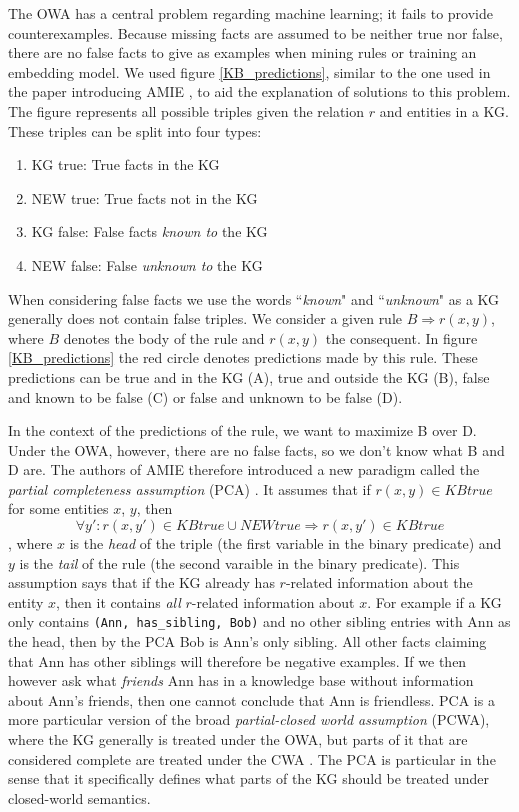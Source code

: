 The OWA has a central problem regarding machine learning; it fails to provide counterexamples. Because missing facts are assumed to be neither true nor false, there are no false facts to give as examples when mining rules or training an embedding model. We used figure \ref{KB_predictions}, similar to the one used in the paper introducing AMIE \cite{amie}, to aid the explanation of solutions to this problem. The figure represents all possible triples given the relation $r$ and entities in a KG. These triples can be split into four types:
\begin{enumerate}
    \item KG true: True facts in the KG
    \item NEW true: True facts not in the KG
    \item KG false: False facts \textit{known to} the KG
    \item NEW false: False \textit{unknown to} the KG
\end{enumerate}
When considering false facts we use the words ``\textit{known}" and ``\textit{unknown}" as a KG generally does not contain false triples. We consider a given rule $B \Rightarrow r(x, y)$, where $B$ denotes the body of the rule and $r(x, y)$ the consequent. In figure \ref{KB_predictions} the red circle denotes predictions made by this rule. These predictions can be true and in the KG (A), true and outside the KG (B), false and known to be false (C) or false and unknown to be false (D). 

In the context of the predictions of the rule, we want to maximize B over D. Under the OWA, however, there are no false facts, so we don't know what B and D are. The authors of AMIE therefore introduced a new paradigm called the \textit{partial completeness assumption} (PCA) \cite{amie}. It assumes that if $r(x, y) \in KB true$ for some entities $x$, $y$, then
\[\forall y' : r(x, y') \in KBtrue \cup NEWtrue \Rightarrow r(x, y') \in KBtrue\]
, where $x$ is the \textit{head} of the triple (the first variable in the binary predicate) and $y$ is the \textit{tail} of the rule (the second varaible in the binary predicate).
This assumption says that if the KG already has $r$-related information about the entity $x$,  then it contains \textit{all} $r$-related information about $x$. For example if a KG only contains \texttt{(Ann, has\_sibling, Bob)} and no other sibling entries with Ann as the head, then by the PCA Bob is Ann's only sibling. All other facts claiming that Ann has other siblings will therefore be negative examples. If we then however ask what \textit{friends} Ann has in a knowledge base without information about Ann's friends, then one cannot conclude that Ann is friendless. PCA is a more particular version of the broad \textit{partial-closed world assumption} (PCWA), where the KG generally is treated under the OWA, but parts of it that are considered complete are treated under the CWA \cite{motro1989integrity}. The PCA is particular in the sense that it specifically defines what parts of the KG should be treated under closed-world semantics.

